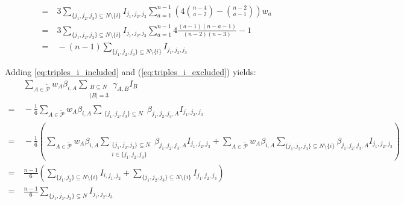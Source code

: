 \begin{equation}
\begin{array}{rll}
        = & \ 3 \sum\limits_{\{j_1,j_2,j_3\} \subseteq N \setminus \{i\}} I_{j_1,j_2,j_3} \sum\limits_{a=1}^{n-1} \left( 4\binom{n-4}{a-2} - \binom{n-2}{a-1} \right) w_a \\
        = & \ 3 \sum\limits_{\{j_1,j_2,j_3\} \subseteq N \setminus \{i\}} I_{j_1,j_2,j_3} \sum\limits_{a=1}^{n-1} 4 \frac{(a-1)(n-a-1)}{(n-2)(n-3)} - 1 \\
        = & \ -(n-1) \sum\limits_{\{j_1,j_2,j_3\} \subseteq N \setminus \{i\}} I_{j_1,j_2,j_3}
	\end{array}
\end{equation}

Adding \cref{eq:triples_i_included} and (\ref{eq:triples_i_excluded}) yields:
\begin{equation*}
	\begin{array}{rl}
        & \ \sum\limits_{A \in \tilde{\mathcal{P}}} w_A \beta_{i,A} \sum\limits_{\substack{B \subseteq N \\ |B| = 3}} \gamma_{A,B} I_B \\
        = & \ - \frac{1}{6} \sum\limits_{A \in \tilde{\mathcal{P}}} w_A \beta_{i,A} \sum\limits_{\substack{\{j_1,j_2,j_3\} \subseteq N}} \beta_{j_1,j_2,j_3,A} I_{j_1,j_2,j_3} \\
        = & \ - \frac{1}{6} \left( \sum\limits_{A \in \tilde{\mathcal{P}}} w_A \beta_{i,A} \sum\limits_{\substack{\{j_1,j_2,j_3\} \subseteq N \\ i \in \{j_1,j_2,j_3\}}} \beta_{j_1,j_2,j_3,A} I_{j_1,j_2,j_3} + \sum\limits_{A \in \tilde{\mathcal{P}}} w_A \beta_{i,A} \sum\limits_{\{j_1,j_2,j_3\} \subseteq N \setminus \{i\}} \beta_{j_1,j_2,j_3,A} I_{j_1,j_2,j_3} \right) \\
        = & \ \frac{n-1}{6} \left( \sum\limits_{\{j_1,j_2\} \subseteq N \setminus \{i\}} I_{i,j_1,j_2} + \sum\limits_{\{j_1,j_2,j_3\} \subseteq N \setminus \{i\}} I_{j_1,j_2,j_3} \right) \\
        = & \ \frac{n-1}{6} \sum\limits_{\{j_1,j_2,j_3\} \subseteq N} I_{j_1,j_2,j_3}
	\end{array}
\end{equation*}

